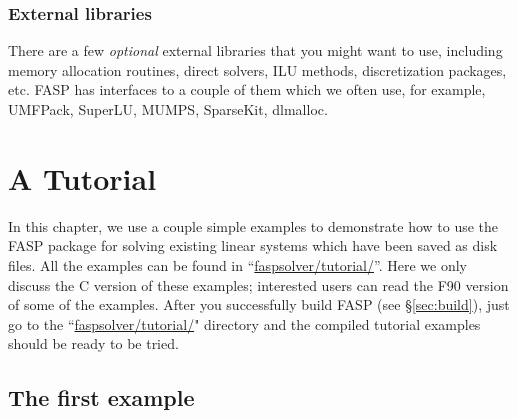 \documentclass[11pt]{memoir}
\begin{document}
\subsection{External libraries}\label{ssec:lib}

There are a few \emph{optional} external libraries that you might want
to use, including memory allocation routines, direct solvers, ILU
methods, discretization packages, etc. FASP has interfaces to a couple
of them which we often use, for example, UMFPack, SuperLU, MUMPS,
SparseKit, dlmalloc.


\chapter{A Tutorial}\label{ch:tutor}

In this chapter, we use a couple simple examples to demonstrate how to use the FASP package for solving existing linear systems which have been saved as disk files. All the examples can be found in ``\url{faspsolver/tutorial/}''. Here we only discuss the C version of these examples; interested users can read the F90 version of some of the examples. After you successfully build FASP (see \S\ref{sec:build}), just go to the ``\url{faspsolver/tutorial/}" directory and the compiled tutorial examples should be ready to be tried.

\section{The first example}\label{sec:ex1}
\end{document}

